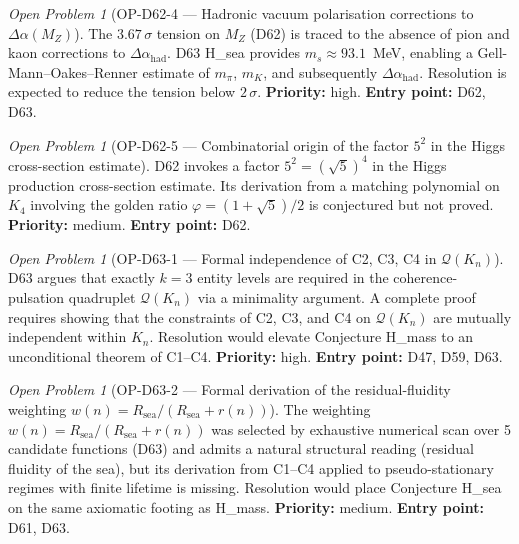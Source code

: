 \documentclass[11pt,a4paper]{article}
\theoremstyle{plain}
\theoremstyle{definition}
\theoremstyle{remark}
\newtheorem{openproblem}[theorem]{Open Problem}
\begin{document}
\begin{openproblem}[OP-D62-4 --- Hadronic vacuum polarisation corrections to $\Delta\alpha(M_Z)$]
\label{op:D62four}
The $3.67\,\sigma$ tension on $M_Z$ (D62) is traced to the absence of pion and kaon corrections to $\Delta\alpha_{\mathrm{had}}$. D63 H\_sea provides $m_s \approx 93.1$~MeV, enabling a Gell-Mann--Oakes--Renner estimate of $m_\pi$, $m_K$, and subsequently $\Delta\alpha_{\mathrm{had}}$. Resolution is expected to reduce the tension below $2\,\sigma$. \textbf{Priority:} high. \textbf{Entry point:} D62, D63.
\end{openproblem}

\begin{openproblem}[OP-D62-5 --- Combinatorial origin of the factor $5^2$ in the Higgs cross-section estimate]
\label{op:D62five}
D62 invokes a factor $5^2 = (\sqrt{5})^4$ in the Higgs production cross-section estimate. Its derivation from a matching polynomial on $K_4$ involving the golden ratio $\varphi = (1+\sqrt{5})/2$ is conjectured but not proved. \textbf{Priority:} medium. \textbf{Entry point:} D62.
\end{openproblem}

\begin{openproblem}[OP-D63-1 --- Formal independence of C2, C3, C4 in $\mathcal{Q}(K_n)$]
\label{op:D63one}
D63 argues that exactly $k=3$ entity levels are required in the coherence-pulsation quadruplet $\mathcal{Q}(K_n)$ via a minimality argument. A complete proof requires showing that the constraints of C2, C3, and C4 on $\mathcal{Q}(K_n)$ are mutually independent within $K_n$. Resolution would elevate Conjecture H\_mass to an unconditional theorem of C1--C4. \textbf{Priority:} high. \textbf{Entry point:} D47, D59, D63.
\end{openproblem}

\begin{openproblem}[OP-D63-2 --- Formal derivation of the residual-fluidity weighting $w(n) = R_{\mathrm{sea}}/(R_{\mathrm{sea}}+r(n))$]
\label{op:D63two}
The weighting $w(n) = R_{\mathrm{sea}}/(R_{\mathrm{sea}}+r(n))$ was selected by exhaustive numerical scan over 5 candidate functions (D63) and admits a natural structural reading (residual fluidity of the sea), but its derivation from C1--C4 applied to pseudo-stationary regimes with finite lifetime is missing. Resolution would place Conjecture H\_sea on the same axiomatic footing as H\_mass. \textbf{Priority:} medium. \textbf{Entry point:} D61, D63.
\end{openproblem}
\end{document}
